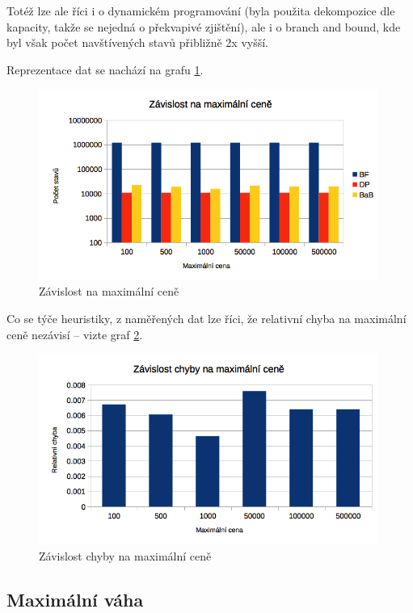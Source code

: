 \documentclass[a4paper]{article}
\begin{document}
		Totéž lze ale říci i o dynamickém programování (byla použita dekompozice dle kapacity, takže se nejedná o překvapivé zjištění), ale i o branch and bound, kde byl však počet navštívených stavů přibližně 2x vyšší.
	
		Reprezentace dat se nachází na grafu \ref{states-maxValue}.
		
		\begin{figure}[h]\centering
			\includegraphics[width=0.99\textwidth]{states-maxValue.png} 
			\caption{Závislost na maximální ceně}
			\label{states-maxValue}
		\end{figure}
		
		Co se týče heuristiky, z naměřených dat lze říci, že relativní chyba na maximální ceně nezávisí -- vizte graf \ref{err-maxValue}.
	
		\begin{figure}[h]\centering
			\includegraphics[width=0.99\textwidth]{err-maxValue.png} 
			\caption{Závislost chyby na maximální ceně}
			\label{err-maxValue}
		\end{figure}
	
	\subsection{Maximální váha}
	
\end{document}
